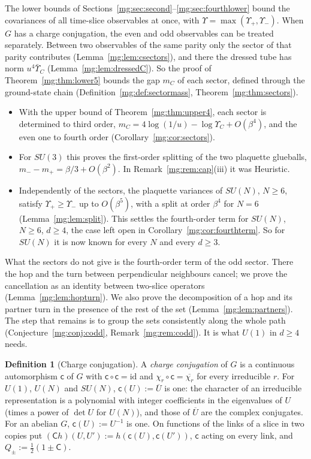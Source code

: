 \documentclass[11pt,a4paper]{article}
\theoremstyle{definition}
\newtheorem{definition}[theorem]{Definition}
\theoremstyle{remark}
\begin{document}
The lower bounds of Sections~\ref{mg:sec:second}--\ref{mg:sec:fourthlower} bound the covariances of all time-slice observables at once, with $\Upsilon=\max(\Upsilon_+,\Upsilon_-)$. When $G$ has a
charge conjugation, the even and odd observables can be treated separately. Between two observables of the same parity only the sector of that parity
contributes (Lemma~\ref{mg:lem:csectors}), and there the dressed tube has norm $u^4\bar\Upsilon_C$ (Lemma~\ref{mg:lem:dressedC}). So the proof of
Theorem~\ref{mg:thm:lower5} bounds the gap $m_C$ of each sector, defined through the ground-state chain (Definition~\ref{mg:def:sectormass}, Theorem~\ref{mg:thm:sectors}).
\begin{itemize}
\item With the upper bound of Theorem~\ref{mg:thm:upper4}, each sector is determined to third order, $m_C=4\log(1/u)-\log\Upsilon_C+O(\beta^4)$, and the even one to fourth
order (Corollary~\ref{mg:cor:sectors}).
\item For $SU(3)$ this proves the first-order splitting of the two plaquette glueballs, $m_--m_+=\beta/3+O(\beta^2)$. In Remark~\ref{mg:rem:cap}(iii) it was Heuristic.
\item Independently of the sectors, the plaquette variances of $SU(N)$, $N\ge6$, satisfy $\Upsilon_+\ge\Upsilon_-$ up to $O(\beta^5)$, with a split at order $\beta^4$ for
$N=6$ (Lemma~\ref{mg:lem:split}). This
settles the fourth-order term for $SU(N)$, $N\ge6$, $d\ge4$, the case left open in Corollary~\ref{mg:cor:fourthterm}. So for $SU(N)$ it is now known for every $N$ and every
$d\ge3$.
\end{itemize}
What the sectors do not give is the fourth-order term of the odd sector. There the hop and the turn between perpendicular neighbours cancel; we prove the
cancellation as an identity between two-slice operators (Lemma~\ref{mg:lem:hopturn}). We also prove the decomposition of a hop and its partner turn in the presence
of the rest of the set (Lemma~\ref{mg:lem:partners}). The step that remains is to group the sets consistently along the whole path
(Conjecture~\ref{mg:conj:codd}, Remark~\ref{mg:rem:codd}). It is what $U(1)$ in $d\ge4$ needs.

\begin{definition}[Charge conjugation]\label{mg:def:charge}
A \emph{charge conjugation} of $G$ is a continuous automorphism $\mathsf c$ of $G$ with $\mathsf c\circ\mathsf c=\mathrm{id}$ and $\chi_r\circ\mathsf c=\overline{\chi_r}$ for every irreducible $r$.
For $U(1)$, $U(N)$ and $SU(N)$, $\mathsf c(U):=\overline U$ is one: the character of an irreducible representation is a polynomial with integer coefficients in
the eigenvalues of $U$ (times a power of $\det U$ for $U(N)$), and those of $\overline U$ are the complex conjugates. For an abelian $G$, $\mathsf c(U):=U^{-1}$ is one.
On functions of the links of a slice in two copies put $(\mathsf Ch)(U,U'):=h(\mathsf c(U),\mathsf c(U'))$, $\mathsf c$ acting on every link, and
$Q_\pm:=\frac12(1\pm\mathsf C)$.
\end{definition}
\end{document}
